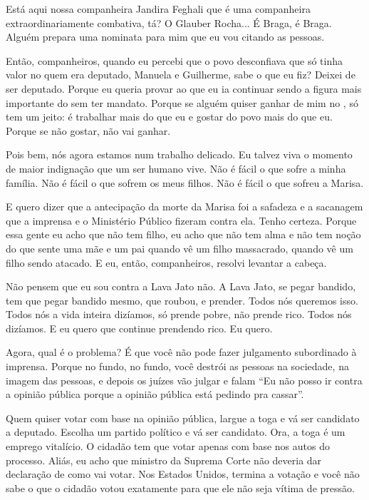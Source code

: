 Está aqui nossa companheira Jandira Feghali que é uma companheira
extraordinariamente combativa, tá? O Glauber Rocha... É Braga, é Braga.
Alguém prepara uma nominata para mim que eu vou citando as pessoas.

Então, companheiros, quando eu percebi que o povo desconfiava que
só tinha valor no  quem era deputado, Manuela e Guilherme, sabe o que
eu fiz? Deixei de ser deputado. Porque eu queria provar ao  que eu ia
continuar sendo a figura mais importante do  sem ter mandato. Porque
se alguém quiser ganhar de mim no , só tem um jeito: é trabalhar mais
do que eu e gostar do povo mais do que eu. Porque se não gostar, não vai
ganhar.

Pois bem, nós agora estamos num trabalho delicado. Eu talvez viva
o momento de maior indignação que um ser humano vive. Não é fácil o que
sofre a minha família. Não é fácil o que sofrem os meus filhos. Não é
fácil o que sofreu a Marisa.

E quero dizer que a antecipação da morte da Marisa foi a
safadeza e a sacanagem que a imprensa e o Ministério Público fizeram
contra ela. Tenho certeza. Porque essa gente eu acho que não tem filho,
eu acho que não tem alma e não tem noção do que sente uma mãe e um pai
quando vê um filho massacrado, quando vê um filho sendo atacado. E eu,
então, companheiros, resolvi levantar a cabeça.

Não pensem que eu sou contra a Lava Jato não. A Lava Jato, se pegar
bandido, tem que pegar bandido mesmo, que roubou, e prender. Todos nós
queremos isso. Todos nós a vida inteira dizíamos, só prende pobre, não
prende rico. Todos nós dizíamos. E eu quero que continue prendendo rico.
Eu quero.

Agora, qual é o problema? É que você não pode fazer julgamento
subordinado à imprensa. Porque no fundo, no fundo, você destrói as
pessoas na sociedade, na imagem das pessoas, e depois os juízes vão
julgar e falam ``Eu não posso ir contra a opinião pública porque a
opinião pública está pedindo pra cassar''.

Quem quiser votar com base na opinião pública, largue a toga e vá
ser candidato a deputado. Escolha um partido político e vá ser
candidato. Ora, a toga é um emprego vitalício. O cidadão tem que votar
apenas com base nos autos do processo. Aliás, eu acho que ministro da
Suprema Corte não deveria dar declaração de como vai votar. Nos Estados
Unidos, termina a votação e você não sabe o que o cidadão votou
exatamente para que ele não seja vítima de pressão.

